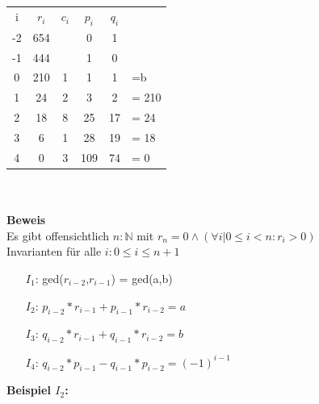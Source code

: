 \documentclass[a4paper,10pt]{article}
\newcommand{\NN}{\mathbb{N}} %
\newcommand{\Bold}[1]{\textbf{#1}} %
\begin{document}
\begin{tabular}{c c c c c l}
	i & $r_i$ & $c_i$ & $p_i$ & $q_i$ & \\
	-2 & 654 & & 0 & 1 & \\
	-1 & 444 & & 1 & 0 & \\
	0 & 210 & 1 & 1 & 1 & =b \\
	1 & 24 & 2 & 3 & 2 & = 210 \\
	2 & 18 & 8 & 25 & 17 & = 24 \\
	3 & 6 & 1 & 28 & 19 & = 18 \\
	4 & 0 & 3 & 109 & 74 & = 0 
\end{tabular} \\
\\
\Bold {Beweis} \\
Es gibt offensichtlich $n:\NN$ mit $r_n=0 \wedge (\forall i | 0 \leq i < n : r_i > 0)$ \\
Invarianten f\"ur alle $i : 0 \leq i \leq n+1$
\begin{itemize}
	\item[$I_1$:] ged($r_{i-2}$,$r_{i-1}$) = ged(a,b) 
	\item[$I_2$:] $p_{i-2} * r_{i-1} + p_{i-1} * r_{i-2} = a$
	\item[$I_3$:] $q_{i-2} * r_{i-1} + q_{i-1} * r_{i-2} = b$
	\item[$I_4$:] $q_{i-2} * p_{i-1} - q_{i-1} * p_{i-2} = (-1)^{i-1}$
\end{itemize}
\Bold {Beispiel $I_2$:}
\end{document}
